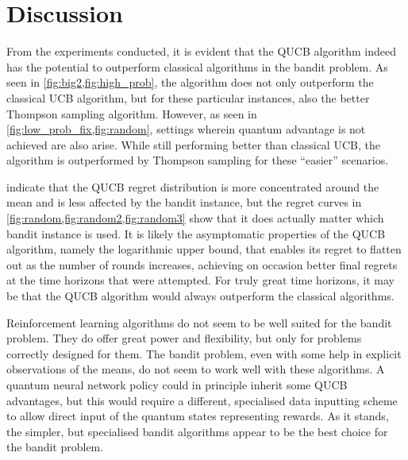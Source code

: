 \section{Discussion}
From the experiments conducted, it is evident that the QUCB algorithm indeed has the potential to outperform classical algorithms in the bandit problem.
As seen in \cref{fig:big2,fig:high_prob}, the algorithm does not only outperform the classical UCB algorithm, but for these particular instances, also the better Thompson sampling algorithm.
However, as seen in \cref{fig:low_prob_fix,fig:random}, settings wherein quantum advantage is not achieved are also arise.
While still performing better than classical UCB, the algorithm is outperformed by Thompson sampling for these \enquote{easier} scenarios.

 indicate that the QUCB regret distribution is more concentrated around the mean and is less affected by the bandit instance, but the regret curves in \cref{fig:random,fig:random2,fig:random3} show that it does actually matter which bandit instance is used.
It is likely the asymptomatic properties of the QUCB algorithm, namely the logarithmic upper bound, that enables its regret to flatten out as the number of rounds increases, achieving on occasion better final regrets at the time horizons that were attempted.
For truly great time horizons, it may be that the QUCB algorithm would always outperform the classical algorithms.

Reinforcement learning algorithms do not seem to be well suited for the bandit problem.
They do offer great power and flexibility, but only for problems correctly designed for them.
The bandit problem, even with some help in explicit observations of the means, do not seem to work well with these algorithms.
A quantum neural network policy could in principle inherit some QUCB advantages, but this would require a different, specialised data inputting scheme to allow direct input of the quantum states representing rewards.
As it stands, the simpler, but specialised bandit algorithms appear to be the best choice for the bandit problem.